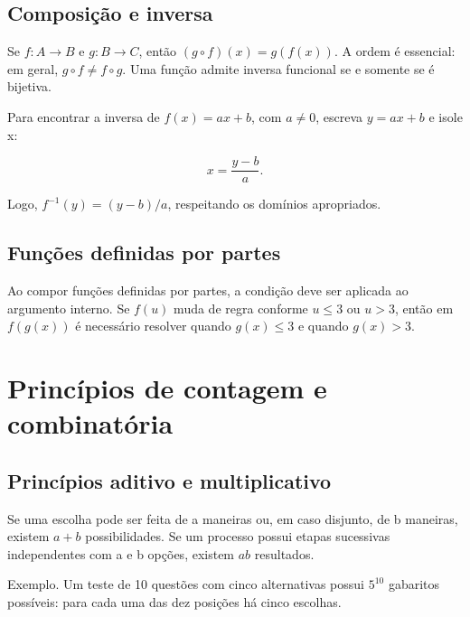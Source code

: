 \documentclass[12pt,a4paper,openany]{book}
\begin{document}
\section{Composição e inversa}



Se $f:A\to B$ e $g:B\to C$, então $(g\circ f)(x)=g(f(x))$. A ordem é essencial: em geral, $g\circ f\neq f\circ g$. Uma função admite inversa funcional se e somente se é bijetiva.



Para encontrar a inversa de $f(x)=ax+b$, com $a\neq0$, escreva $y=ax+b$ e isole x:



\[x=\frac{y-b}{a}.\]



Logo, $f^{-1}(y)=(y-b)/a$, respeitando os domínios apropriados.



\section{Funções definidas por partes}



Ao compor funções definidas por partes, a condição deve ser aplicada ao argumento interno. Se $f(u)$ muda de regra conforme $u\leq3$ ou $u>3$, então em $f(g(x))$ é necessário resolver quando $g(x)\leq3$ e quando $g(x)>3$.



\chapter{Princípios de contagem e combinatória}



\section{Princípios aditivo e multiplicativo}



Se uma escolha pode ser feita de a maneiras ou, em caso disjunto, de b maneiras, existem $a+b$ possibilidades. Se um processo possui etapas sucessivas independentes com a e b opções, existem $ab$ resultados.



\begin{exemplo}{Exemplo.}
Um teste de 10 questões com cinco alternativas possui $5^{10}$ gabaritos possíveis: para cada uma das dez posições há cinco escolhas.
\end{exemplo}
\end{document}
